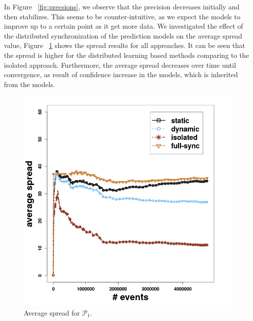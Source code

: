 
\par In Figure ~\ref{fig:precsions}, we observe that the precision decreases initially and then stabilizes. This seems to be counter-intuitive, as we expect the models to improve up to a certain point as it get more data. We  investigated the effect of the distributed synchronization of the prediction models on the average spread value, Figure  ~\ref{fig:spread}  shows the spread results for all approaches. It can be seen that the spread is higher for the distributed learning based methods comparing to the isolated approach. Furthermore, the average spread decreases over time until convergence, as result of confidence increase in the models, which is inherited from the \pmcmr models. 

\begin{center}
	
	\begin{figure}[H]
		\centering
		\includegraphics[width=\textwidth,height=.65\textheight]{chapters/figures/synopses/p1_spread_100_2_08.png}
		
		\caption{Average spread for $\mathcal{P}_1$.}
		\label{fig:spread}
	\end{figure}
\end{center}


